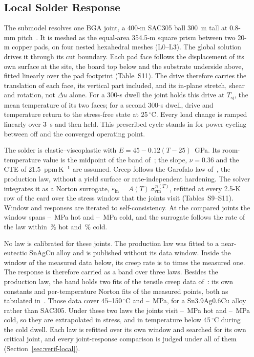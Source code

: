 \subsection{Local Solder Response}\label{sec:local}
The submodel resolves one BGA joint, a 400-\textmu m SAC305 ball 300~\textmu m tall at 0.8-mm
pitch~\cite{Krishnakumar2026DVPD}. It is meshed as the equal-area 354.5-\textmu m square prism
between two 20-\textmu m copper pads, on four nested hexahedral meshes (L0--L3). The global
solution drives it through its cut boundary. Each pad face follows the displacement of its own
surface at the site, the board top below and the substrate underside above, fitted linearly over
the pad footprint (Table~S11). The drive therefore carries the translation of each face, its
vertical part included, and its in-plane stretch, shear and rotation, not $\Delta u$ alone. For a
300-s dwell the joint holds this drive at $T_{\mathrm{sj}}$, the mean temperature of its two faces;
for a second 300-s dwell, drive and temperature return to the stress-free state at
25\,$^\circ$C. Every load change is ramped linearly over 3~s and then held. This prescribed cycle
stands in for power cycling between off and the converged operating point.

The solder is elastic--viscoplastic with $E = 45 - 0.12(T-25)$~GPa. Its room-temperature value is
the midpoint of the band of~\cite{Paska2024SAC305}; the slope, $\nu = 0.36$ and the CTE of
21.5~ppm\,K$^{-1}$ are assumed. Creep follows the Garofalo law of~\cite{Schubert2003ECTC}, the
production law, without a yield surface or rate-independent hardening. The solver integrates it
as a Norton surrogate, $\dot\varepsilon_{\mathrm{in}} = A(T)\,\sigma_{\mathrm{vm}}^{\,n(T)}$,
refitted at every 2.5-K row of the card over the stress window that the joints visit
(Tables~S9--S11). Window and responses are iterated to self-consistency. At the compared joints
the window spans \MvVisHotLo--\MvVisHotHi~MPa hot and \MvVisColdLo--\MvVisColdHi~MPa cold, and the
surrogate follows the rate of the law within \MvSurrErrHot\,\% hot and \MvSurrErrCold\,\% cold.

No law is calibrated for these joints. The production law was fitted to a near-eutectic SnAgCu
alloy and is published without its data window. Inside the window of the measured data below, its
creep rate is \MvRateVsDataLo{} to \MvRateVsDataHi{} times the measured one. The response is
therefore carried as a band over three laws. Besides the production law, the band holds two fits
of the tensile creep data of~\cite{Xiao2005SAC}: its own constants and per-temperature Norton fits
of the measured points, both as tabulated in~\cite{Yuan2023SAC305}. Those data cover
45--150\,$^\circ$C and \MthCalLo--\MthCalHi~MPa, for a Sn3.9Ag0.6Cu alloy rather than SAC305. Under
these two laws the joints visit \MvXiaoVisHotLo--\MvMeasVisHotHi~MPa hot and
\MvXiaoVisColdLo--\MvMeasVisColdHi~MPa cold, so they are extrapolated in stress, and in temperature
below 45\,$^\circ$C during the cold dwell. Each law is refitted over its own window and searched
for its own critical joint, and every joint-response comparison is judged under all of them
(Section~\ref{sec:verif-local}).

